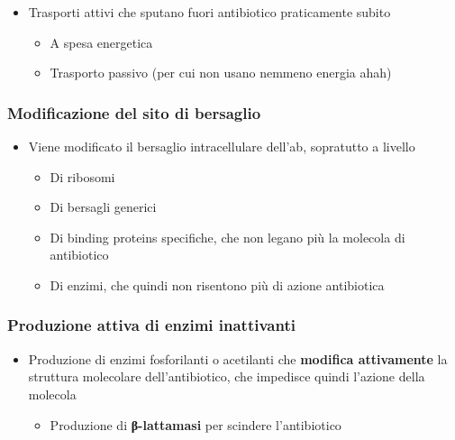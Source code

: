 \documentclass[italian,]{article}
\providecommand{\tightlist}{%
  \setlength{\itemsep}{0pt}\setlength{\parskip}{0pt}}
\newcommand{\marginnote}[1]{\marginpar{\footnotesize← \emph{#1}}}
\begin{document}
\begin{itemize}
\tightlist
\item
  Trasporti attivi che sputano fuori antibiotico praticamente subito

  \begin{itemize}
  \tightlist
  \item
    A spesa energetica
  \item
    Trasporto passivo (per cui non usano nemmeno energia ahah)
  \end{itemize}
\end{itemize}

\hypertarget{modificazione-del-sito-di-bersaglio}{%
\subsubsection{Modificazione del sito di
bersaglio}\label{modificazione-del-sito-di-bersaglio}}

\begin{itemize}
\tightlist
\item
  Viene modificato il bersaglio intracellulare dell'ab, sopratutto a
  livello

  \begin{itemize}
  \tightlist
  \item
    Di ribosomi
  \item
    Di bersagli generici \marginnote{vedi \texttt{vancomicina}}
  \item
    Di binding proteins specifiche, che non legano più la molecola di
    antibiotico
  \item
    Di enzimi, che quindi non risentono più di azione antibiotica
  \end{itemize}
\end{itemize}

\hypertarget{produzione-attiva-di-enzimi-inattivanti}{%
\subsubsection{Produzione attiva di enzimi
inattivanti}\label{produzione-attiva-di-enzimi-inattivanti}}

\begin{itemize}
\tightlist
\item
  Produzione di enzimi fosforilanti o acetilanti che \textbf{modifica
  attivamente} la struttura molecolare dell'antibiotico, che impedisce
  quindi l'azione della molecola

  \begin{itemize}
  \tightlist
  \item
    Produzione di \textbf{β-lattamasi} per scindere l'antibiotico
  \end{itemize}
\end{itemize}
\end{document}
